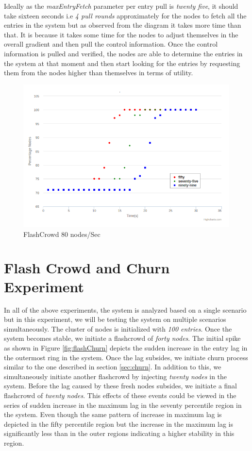 \documentclass[a4paper,11pt]{kth-mag}
\begin{document}
\par Ideally as the \textit{maxEntryFetch} parameter per entry pull is \textit{twenty five}, it should take sixteen seconds i.e \textit{4 pull rounds} approximately for the nodes to fetch all the entries in the system but as observed from the diagram it takes more time than that. It is because it takes some time for the nodes to adjust themselves in the overall gradient and then pull the control information. Once the control information is pulled and verified, the nodes are able to determine the entries in the system at that moment and then start looking for the entries by requesting them from the nodes higher than themselves in terms of utility.

\begin{figure}[h]
	\includegraphics[scale=0.5]{200-80Nodes}
	\caption{FlashCrowd 80 nodes/Sec }
	\label{fig:flash80}
\end{figure}



\section{Flash Crowd and Churn Experiment}

In all of the above experiments, the system is analyzed based on a single scenario but in this experiment, we will be testing the system on multiple scenarios simultaneously. The cluster of nodes is initialized with \textit{100 entries}. Once the system becomes stable, we initiate a flashcrowd of \textit{forty nodes}. The initial spike as shown in Figure \ref{fig:flashChurn} depicts the sudden increase in the entry lag in the outermost ring in the system. Once the lag subsides, we initiate churn process similar to the one described in section  \ref{sec:churn}. In addition to this, we simultaneously initiate another flashcrowd by injecting \textit{twenty nodes} in the system. Before the lag caused by these fresh nodes subsides, we initiate a final flashcrowd of \textit{twenty nodes}. This effects of these events could be viewed in the series of sudden increase in the maximum lag in the seventy percentile region in the system. Even though the same pattern of increase in maximum lag is depicted in the fifty percentile region but the increase in the maximum lag is significantly less than in the outer regions indicating a higher stability in this region. 
\end{document}
